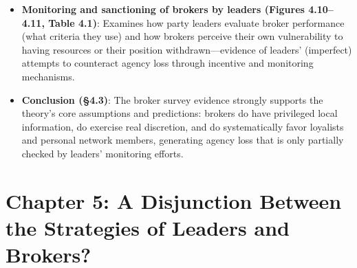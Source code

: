 \documentclass[12pt]{article}
\begin{document}
\begin{itemize}[leftmargin=*, itemsep=4pt]
    \item \textbf{Monitoring and sanctioning of brokers by leaders (Figures 4.10--4.11, Table 4.1)}: Examines how party leaders evaluate broker performance (what criteria they use) and how brokers perceive their own vulnerability to having resources or their position withdrawn---evidence of leaders' (imperfect) attempts to counteract agency loss through incentive and monitoring mechanisms.
    \item \textbf{Conclusion (\S4.3)}: The broker survey evidence strongly supports the theory's core assumptions and predictions: brokers do have privileged local information, do exercise real discretion, and do systematically favor loyalists and personal network members, generating agency loss that is only partially checked by leaders' monitoring efforts.
\end{itemize}

\section{Chapter 5: A Disjunction Between the Strategies of Leaders and Brokers?}
\end{document}
